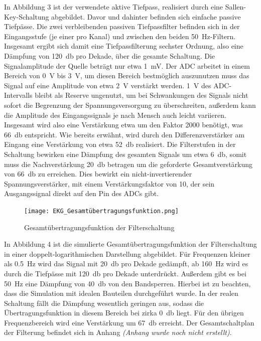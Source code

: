 In Abbildung 3 ist der verwendete aktive Tiefpass, realisiert durch eine Sallen-Key-Schaltung abgebildet. Davor und dahinter befinden sich einfache passive Tiefpässe. Die zwei verbleibenden passiven Tiefpassfilter befinden sich in der Eingangsstufe (je einer pro Kanal) und zwischen den beiden \SI{50}{\hertz}-Filtern. Insgesamt ergibt sich damit eine Tiefpassfilterung sechster Ordnung, also eine Dämpfung von \SI{120}{\decibel} pro Dekade, über die gesamte Schaltung. Die Signalamplitude der Quelle beträgt nur etwa \SI{1}{\milli\volt}. Der ADC arbeitet in einem Bereich von \SI{0}{\volt} bis \SI{3}{\volt}, um diesen Bereich bestmöglich auszunutzen muss das Signal auf eine Amplitude von etwa \SI{2}{\volt} verstärkt werden. \SI{1}{\volt} des ADC-Intervalls bleibt als Reserve ungenutzt, um bei Schwankungen des Signals nicht sofort die Begrenzung der Spannungsversorgung zu überschreiten, außerdem kann die Amplitude des Eingangssignals je nach Mensch auch leicht variieren. Insgesamt wird also eine Verstärkung etwa um den Faktor 2000 benötigt, was \SI{66}{\decibel} entspricht. Wie bereits erwähnt, wird durch den Differenzverstärker am Eingang eine Verstärkung von etwa \SI{52}{\decibel} realisiert. Die Filterstufen in der Schaltung bewirken eine Dämpfung des gesamten Signals um etwa \SI{6}{\decibel}, somit muss die Nachverstärkung \SI{20}{\decibel} betragen um die geforderte Gesamtverstärkung von \SI{66}{\decibel} zu erreichen. Dies bewirkt ein nicht-invertierender Spannungsverstärker, mit einem Verstärkungsfaktor von 10, der sein Ausgangssignal direkt auf den Pin des ADCs gibt.

\begin{figure} [!h]
	\texttt{[image: EKG\_Gesamtübertragungsfunktion.png]}
	\caption{Gesamtübertragungsfunktion der Filterschaltung}
	\label{fig4} 
\end{figure}

In Abbildung 4 ist die simulierte Gesamtübertragungsfunktion der Filterschaltung in einer doppelt-logarithmischen Darstellung abgebildet. Für Frequenzen kleiner als \SI{0,5}{\hertz} wird das Signal mit \SI{20}{\decibel} pro Dekade gedämpft, ab \SI{160}{\hertz} wird es durch die Tiefpässe mit \SI{120}{\decibel} pro Dekade unterdrückt. Außerdem gibt es bei \SI{50}{\hertz} eine Dämpfung von \SI{40}{\decibel} von den Bandsperren. Hierbei ist zu beachten, dass die Simulation mit idealen Bauteilen durchgeführt wurde. In der realen Schaltung fällt die Dämpfung wesentlich geringen aus, sodass die Übertragungsfunktion in diesem Bereich bei zirka \SI{0}{\decibel} liegt. Für den übrigen Frequenzbereich wird eine Verstärkung um \SI{67}{\decibel} erreicht. Der Gesamtschaltplan der Filterung befindet sich in Anhang \textit{(Anhang wurde noch nicht erstellt)}. 


